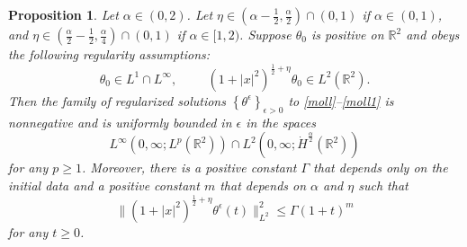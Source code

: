 \documentclass[12pt,reqno]{amsart}
\newcommand{\be}{\begin{equation}}
\newcommand{\ee}{\end{equation}}
\newtheorem{prop}[thm]{Proposition}
\newcommand{\R}{\mathbb R}
\def\RR{{\mathbb R}}
\begin{document}
\begin{prop} \label{propsec3} Let $\alpha \in (0,2)$. Let $\eta \in \left(\alpha - \frac{1}{2}, \frac{\alpha}{2} \right) \cap (0,1)$ if $\alpha \in (0,1)$, and $\eta \in \left(\frac{\alpha}{2} - \frac{1}{2}, \frac{\alpha}{4} \right) \cap (0,1)$ if $\alpha \in [1,2)$. 
Suppose $\theta_0$ is positive on $\R^2$ and obeys the following regularity assumptions:
\be 
\theta_0 \in L^1 \cap L^{\infty}, \hspace{1cm}  (1+|x|^2)^{\frac{1}{2}+\eta} \theta_0 \in L^2(\R^2).   
\ee Then the family of regularized solutions $\left\{\theta^{\epsilon} \right\}_{\epsilon > 0}$ to \eqref{moll}--\eqref{moll1} is nonnegative and is uniformly bounded in $\epsilon$ in the spaces 
\be 
L^{\infty}(0,\infty; L^p(\RR^2)) \cap L^2(0, \infty; \dot{H}^{\frac{\alpha}{2}}(\R^2))
\ee for any $p \ge 1$. Moreover, there is a positive constant $\Gamma$ that depends only on the initial data and a positive constant $m$ that depends on $\alpha$ and $\eta$ such that  
\be 
\|(1+|x|^2)^{\frac{1}{2}+\eta} \theta^{\epsilon}(t)\|_{L^2}^2 \le \Gamma (1+t)^m
\ee for any $t \ge 0$.
\end{prop}
\end{document}
